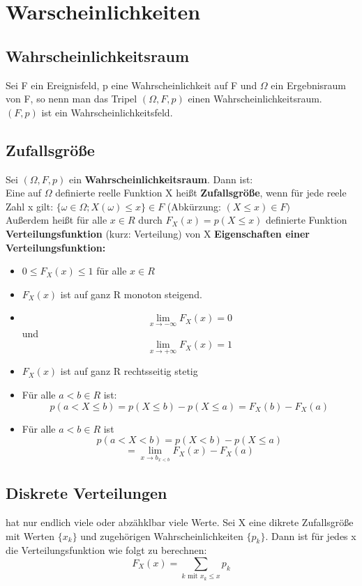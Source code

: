 \documentclass[german]{latex4ei/latex4ei_sheet}
\begin{document}
\section{Warscheinlichkeiten}
\begin{sectionbox}

\subsection{Wahrscheinlichkeitsraum}
Sei F ein  Ereignisfeld, p eine Wahrscheinlichkeit auf F und $\Omega$ ein Ergebnisraum von F, so nenn man das Tripel $(\Omega, F, p )$ einen Wahrscheinlichkeitsraum. $(F,p)$ ist ein Wahrscheinlichkeitsfeld. 

\subsection{Zufallsgröße}
Sei $(\Omega, F, p)$ ein \textbf{Wahrscheinlichkeitsraum}. Dann ist: \\
Eine auf $\Omega $ definierte reelle Funktion X heißt \textbf{Zufallsgröße}, wenn für jede reele Zahl x gilt:
$\{\omega \in \Omega; X(\omega) \leq x\} \in F $ (Abkürzung: $(X\leq x) \in F)$ \\

Außerdem heißt für alle $x\in R$ durch
$F_{X}(x) = p(X \leq x) $ definierte Funktion \textbf{Verteilungsfunktion} (kurz: Verteilung) von X
\textbf{Eigenschaften einer Verteilungsfunktion:}
\begin{itemize}
  \item $0 \leq F_{X}(x) \leq 1 $ für alle $x \in R$
  \item $ F_{X}(x)$ ist auf ganz R monoton steigend.
  \item $$\lim_{x \to -\infty}F_{X}(x) = 0 $$ und $$\lim_{x \to +\infty}F_{X}(x) = 1 $$
  \item $F_X(x)$ ist auf ganz R rechtsseitig stetig
  \item Für alle $a < b \in R$ ist:
  $$ p(a<X \leq b) = p(X \leq b) - p(X\leq a) = F_X(b) - F_X(a)$$
  \item Für alle $a <b \in R$ ist
  $$ p(a<X < b) = p(X < b) - p(X\leq a) $$
  $$= \lim_{x\to b_{x<b}}F_X(x) - F_X(a)$$
\end{itemize}

\subsection{Diskrete Verteilungen} 
hat nur endlich viele oder abzähklbar viele Werte.
Sei X eine dikrete Zufallsgröße mit Werten $\{x_k\}$ und zugehörigen Wahrscheinlichkeiten $\{p_k\}$. Dann ist für jedes x die Verteilungsfunktion wie folgt zu berechnen:
$$ F_X(x) = \sum_{k \text{ mit } x_k \leq x} p_k$$


\end{sectionbox}
\end{document}
